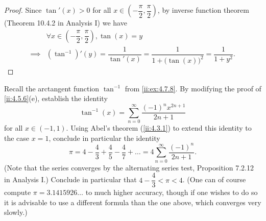 \begin{proof}
  Since \(\tan'(x) > 0\) for all \(x \in (-\dfrac{\pi}{2}, \dfrac{\pi}{2})\), by inverse function theorem (Theorem 10.4.2 in Analysis I) we have
  \begin{align*}
             & \forall x \in (-\dfrac{\pi}{2}, \dfrac{\pi}{2}), \tan(x) = y                                     \\
    \implies & (\tan^{-1})'(y) = \dfrac{1}{\tan'(x)} = \dfrac{1}{1 + \big(\tan(x)\big)^2} = \dfrac{1}{1 + y^2}.
  \end{align*}
\end{proof}

\begin{ex}\label{ii:ex:4.7.9}
  Recall the arctangent function \(\tan^{-1}\) from \cref{ii:ex:4.7.8}.
  By modifying the proof of \cref{ii:4.5.6}(e), establish the identity
  \[
    \tan^{-1}(x) = \sum_{n = 0}^\infty \dfrac{(-1)^n x^{2n + 1}}{2n + 1}
  \]
  for all \(x \in (-1, 1)\).
  Using Abel's theorem (\cref{ii:4.3.1}) to extend this identity to the case \(x = 1\), conclude in particular the identity
  \[
    \pi = 4 - \dfrac{4}{3} + \dfrac{4}{5} - \dfrac{4}{7} + \dots = 4 \sum_{n = 0}^\infty \dfrac{(-1)^n}{2n + 1}.
  \]
  (Note that the series converges by the alternating series test, Proposition 7.2.12 in Analysis I.)
  Conclude in particular that \(4 - \dfrac{4}{3} < \pi < 4\).
  (One can of course compute \(\pi = 3.1415926 \dots\) to much higher accuracy, though if one wishes to do so it is advisable to use a different formula than the one above, which converges very slowly.)
\end{ex}

